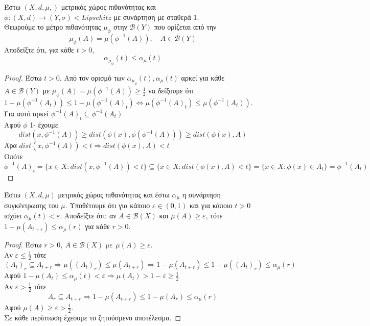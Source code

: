 \documentclass[a4paper,11pt,draft]{article} %
\date{}
\begin{document}
\begin{problem}[1]
    Έστω \((X,d,\mu,)\) μετρικός χώρος πιθανότητας και \(\phi :(X,d) \to (Y,\sigma)
    \lt{Lipschitz}\) με συνάρτηση με σταθερά 1.\\
    Θεωρούμε το μέτρο πιθανότητας \(\mu_{\phi}\) στην \(\mathcal{B}(Y)\) που ορίζεται 
    από την 
    \[\mu_{\phi}(A) = \mu(\phi^{-1}(A)), \quad A \in \mathcal{B}(Y)\]
    Αποδείξτε ότι, για κάθε \(t >0\),
    \[\alpha_{\mu_{\phi}}(t) \leq \alpha_{\mu}(t)\]
    \end{problem}
    
    \begin{proof}
        Έστω \(t>0\).
        Από τον ορισμό των \(\alpha_{\mu_{\phi}}(t), \alpha_{\mu}(t)\)
        αρκεί για κάθε \(A \in \mathcal{B}(Y)\) με \(\mu_{\phi}(A) = \mu(\phi^{-1}(A)) \geq \frac{1}{2}\)
        να δείξουμε ότι \(1-\mu(\phi^{-1}(A_t)) \leq 1-\mu(\phi^{-1}(A)_t)
        \iff \mu(\phi^{-1}(A)_t) \leq \mu(\phi^{-1}(A_t))\). \\
        Για αυτό αρκεί \(\phi^{-1}(A)_t \subseteq \phi^{-1}(A_t)\)\\
        Αφού \(\phi\) 1- έχουμε 
        \[dist(x,\phi^{-1}(A)) \geq dist(\phi(x),\phi(\phi^{-1}(A))) \geq 
        dist(\phi(x),A)\]
        Άρα \(dist(x,\phi^{-1}(A)) <t \Rightarrow dist(\phi(x),A) <t\)\\
        Οπότε 
        \[\phi^{-1}(A)_t = \{x \in X : dist(x,\phi^{-1}(A)) <t\} \subseteq
        \{x \in X: dist(\phi(x),A) <t\} = \{x \in X: \phi(x) \in A_t\} = \phi^{-1}(A_t)
        \]
    \end{proof}
    
    \begin{problem}[2]
    Έστω $(X,d,\mu )$ μετρικός χώρος πιθανότητας και
    έστω $\alpha_{\mu }$ η συνάρτηση συγκέντρωσης του $\mu $. Υποθέτουμε
    ότι για κάποιο $\varepsilon \in (0,1)$ και για κάποιο $t>0$ ισχύει
    $\alpha_{\mu }(t)<\varepsilon $. Αποδείξτε ότι: αν $A \in \mathcal{B}(X)$ και $\mu (A)\geq \varepsilon $, τότε $1-\mu (A_{t+r})\leq
    \alpha_{\mu }(r)$ για κάθε $r>0$.    
    \end{problem}
    \begin{proof}
    Έστω \(r > 0, \ A \in \mathcal{B}(X) \text{ με } \mu(A) \geq \varepsilon\). \\
    Αν \(\varepsilon \leq \frac{1}{2}\) τότε 
    \[(A_t)_r \subseteq A_{t+r} \Rightarrow \mu((A_t)_r) \leq \mu(A_{t+r})
    \Rightarrow 1-\mu(A_{t+r}) \leq 1-\mu((A_t)_r) \leq \alpha_{\mu}(r) \]
    Αφού \(1-\mu(A_t) \leq \alpha_{\mu}(t) < \varepsilon \Rightarrow 
    \mu(A_t) > 1-\varepsilon \geq \frac{1}{2}\)\\
    Αν \(\varepsilon > \frac{1}{2}\) τότε 
    \[A_r \subseteq A_{t+r} \Rightarrow 1-\mu(A_{t+r}) \leq 1-\mu(A_r) \leq \alpha_{\mu}(r)\]
    Αφού \(\mu(A) \geq \varepsilon > \frac{1}{2}\).\\
    Σε κάθε περίπτωση έχεουμε το ζητούσμενο αποτέλεσμα.  
    \end{proof}
\end{document}
